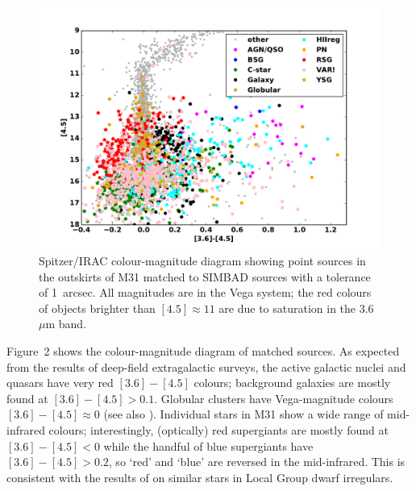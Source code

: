 \documentclass{iau}
\begin{document}
\begin{figure}[t]
\begin{center}
 \includegraphics[width=4.5in]{barmby_iaus321_fig2} 
 \caption{Spitzer/IRAC colour-magnitude diagram showing point sources in the outskirts of M31 matched to SIMBAD
 sources with a tolerance of 1~arcsec. All magnitudes are in the Vega system; the red colours of objects brighter than
 $[4.5]\approx 11$ are due to saturation in the 3.6~$\mu$m band.}
   \label{fig2}
\end{center}
\end{figure}

Figure~2 shows the colour-magnitude diagram of matched sources. As expected from the results of deep-field extragalactic surveys,
the active galactic nuclei and quasars have very red $[3.6]-[4.5]$ colours; background galaxies are mostly found at $[3.6]-[4.5]>0.1$.
Globular clusters have Vega-magnitude colours  $[3.6]-[4.5]\approx 0$ (see also \cite[Barmby \& Jalilian 2012)]{bj12}).
Individual stars in M31 show a wide range of mid-infrared colours; interestingly, (optically) red supergiants are mostly found at $[3.6]-[4.5]<0$
while the handful of blue supergiants have $[3.6]-[4.5]>0.2$, so `red' and `blue' are reversed in the mid-infrared.
This is consistent with the results of \cite[Britavskiy \etal\ (2015)]{brit15} on similar stars in Local Group dwarf irregulars.
\end{document}
